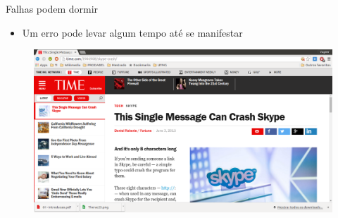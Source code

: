 \documentclass[t,14pt,mathserif]{beamer}
\begin{document}
\begin{frame}{Falhas podem dormir}
	
	\begin{itemize}
		\item Um erro pode levar algum tempo até se manifestar
	\end{itemize}


	\begin{figure}[!t]
		\centering
		\includegraphics[width=4.5in]{../img/erro_skype.png}
		\label{fig:knight}
	\end{figure}
\end{frame}
\end{document}
